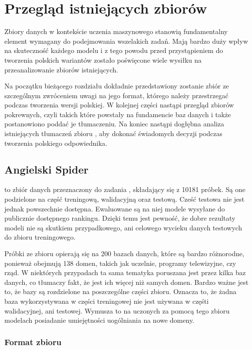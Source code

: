 \chapter{Przegląd istniejących zbiorów}
Zbiory danych w kontekście uczenia maszynowego stanowią fundamentalny element wymagany do podejmowania wszelakich zadań. Mają bardzo duży wpływ na skuteczność każdego modelu i z tego powodu przed przystąpieniem do tworzenia polskich wariantów zostało poświęcone wiele wysiłku na przeanalizowanie zbiorów istniejących.

Na początku bieżącego rozdziału dokładnie przedstawiony zostanie zbiór  ze szczególnym zwróceniem uwagi na jego format, którego należy przestrzegać podczas tworzenia wersji polskiej. W kolejnej części nastąpi przegląd zbiorów pokrewnych, czyli takich które powstały na fundamencie baz danych  i także postanowiono poddać je tłumaczeniu. Na koniec nastąpi dogłębna analiza istniejących tłumaczeń zbioru , aby dokonać świadomych decyzji podczas tworzenia polskiego odpowiednika.

\section{Angielski Spider}
 to zbiór danych przeznaczony do zadania , składający się z 10181 próbek. Są one podzielone na część treningową, walidacyjną oraz testową. Cześć testowa nie jest jednak powszechnie dostępna. Ewaluowane są na niej modele wysyłane do publicznie dostępnego rankingu. Dzięki temu jest pewność, że dobre rezultaty modeli nie są skutkiem przypadkowego, ani celowego wycieku danych testowych do zbioru treningowego.

Próbki ze zbioru  opierają się na 200 bazach danych, które są bardzo różnorodne, ponieważ obejmują 138 domen, takich jak uczelnie, programy telewizyjne, czy rząd. W niektórych przypadach ta sama tematyka poruszana jest przez kilka baz danych, co tłumaczy fakt, że jest ich więcej niż samych domen. Bardzo ważne jest to, że bazy są rozdzielone na poszczególne części zbioru. Oznacza to, że żadna baza wykorzystywana w części treningowej nie jest używana w częśti walidacyjnej, ani testowej. Wymusza to na uczonych za pomocą tego zbioru modelach posiadanie umiejętności uogólniania na nowe domeny.

\subsection{Format zbioru}

